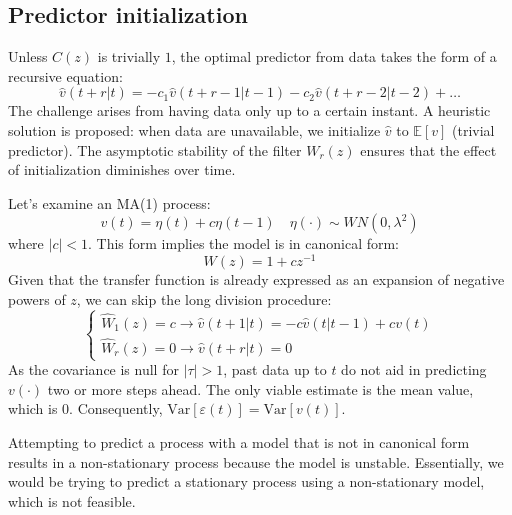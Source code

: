 \subsection{Predictor initialization}
Unless $C(z)$ is trivially $1$, the optimal predictor from data takes the form of a recursive equation:
\[\hat{v}(t+r|t)=-c_1\hat{v}(t+r-1|t-1)-c_2\hat{v}(t+r-2|t-2)+\dots\]
The challenge arises from having data only up to a certain instant. 
A heuristic solution is proposed: when data are unavailable, we initialize $\hat{v}$ to $\mathbb{E}[v]$ (trivial predictor).
The asymptotic stability of the filter $W_r(z)$ ensures that the effect of initialization diminishes over time.
\begin{example}
    Let's examine an MA(1) process:
    \[v(t)=\eta(t)+c\eta(t-1) \quad\eta(\cdot)\sim WN(0,\lambda^2)\] 
    where $\left\lvert c \right\rvert<1$. 
    This form implies the model is in canonical form:
    \[W(z)=1+cz^{-1}\]
    Given that the transfer function is already expressed as an expansion of negative powers of $z$, we can skip the long division procedure:
    \[\begin{cases}
        \hat{W}_1(z)=c \rightarrow \hat{v}(t+1|t)=-c\hat{v}(t|t-1)+cv(t) \\
        \hat{W}_r(z)=0 \rightarrow \hat{v}(t+r|t)=0
    \end{cases}\]
    As the covariance is null for $|\tau| > 1$, past data up to $t$ do not aid in predicting $v(\cdot)$ two or more steps ahead. 
    The only viable estimate is the mean value, which is 0. 
    Consequently, $\text{Var}[\varepsilon(t)] = \text{Var}[v(t)]$.
\end{example}
Attempting to predict a process with a model that is not in canonical form results in a non-stationary process because the model is unstable. 
Essentially, we would be trying to predict a stationary process using a non-stationary model, which is not feasible.